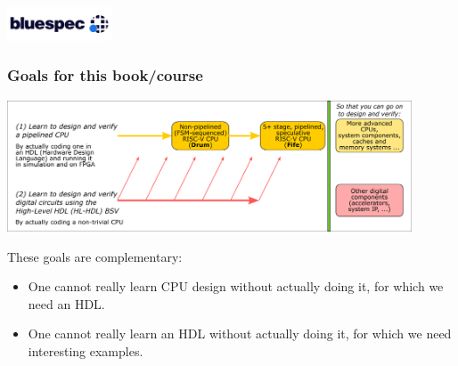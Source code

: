 



\date{L1: Introduction}





\begin{frame}
 \titlepage

 \begin{center}
  \includegraphics[height=1cm]{../Figures/Bluespec_Logo_2022-10}
 \end{center}
\end{frame}



\begin{frame}
\frametitle{Goals for this book/course}

\begin{center}
 \includegraphics[width=0.9\textwidth]{../Figures/Fig_Goals}
\end{center}

These goals are complementary:
\begin{itemize}

 \item One cannot really learn CPU design without actually doing it,
       for which we need an HDL.

 \item One cannot really learn an HDL without actually doing it, for
       which we need interesting examples.

\end{itemize}

\end{frame}

